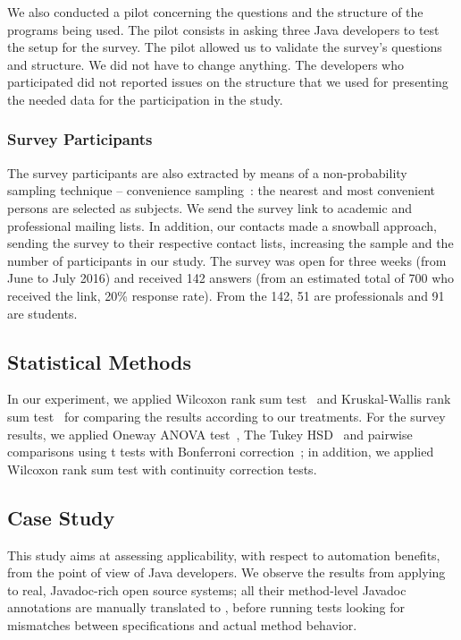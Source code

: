 We also conducted a pilot concerning the
questions and the structure of the programs being used. The pilot consists in asking three Java
developers to test the setup for the survey.
The pilot allowed us to validate the survey's questions and structure.
We did not have to change anything. The developers who participated did not reported issues on the structure that we
used for presenting the needed data for the participation in the study.


\subsubsection{Survey Participants}
\label{sec:surveyPart}

The survey participants are also extracted by means of a 
non-probability sampling technique -- convenience
sampling~\cite{wohlin}: the nearest and most convenient persons are selected as subjects. We send
the survey link to academic and professional mailing lists.
In addition, our contacts made a snowball approach, sending the survey to their respective
contact lists, increasing the sample and the number of participants in our study.
The survey was open for three weeks (from June to July 2016) and received 142
answers (from an estimated total of 700 who received the link, 20\% response
rate). From the 142, 51 are professionals and 91 are students.

\subsection{Statistical Methods}
\label{sec:statisticalMethods}

In our experiment, we applied Wilcoxon rank sum test~\cite{statistical} and Kruskal-Wallis rank sum test~\cite{statistical} for comparing the results according to our treatments. For the survey results, we applied Oneway ANOVA test~\cite{statistical}, The Tukey HSD~\cite{statistical} and pairwise comparisons using t tests
with Bonferroni correction~\cite{statistical}; in addition, we applied Wilcoxon rank sum test with continuity correction
tests.








\subsection{Case Study}
\label{sec:caseStudy}
This study aims at assessing \contractjdoc{} applicability, with respect to automation benefits, from the point of view of Java developers. 
We observe the results from applying \contractjdoc{} to \totalSystems{} real,
Javadoc-rich open source systems; all their method-level
Javadoc annotations are manually translated to \contractjdoc{}, before
running tests looking for mismatches between specifications and actual method
behavior.

